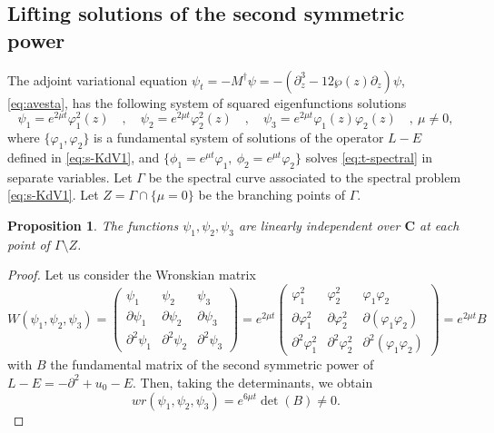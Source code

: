 \documentclass[a4paper,12pt]{article}
\newcommand{\coC}{\mathbf{C}}
\newtheorem{prop}[thm]{Proposition}
\begin{document}
\subsection{Lifting solutions of the second symmetric power}\label{sec-lifting}

The adjoint variational equation  $ \psi_t = - M^\dag  \psi  =-(\partial_z^3  -12\wp(z)\partial_z ) \psi$, \eqref{eq:avesta}, has the following system of squared eigenfunctions solutions
\begin{equation}
    \psi_1= e^{2\mu t}\varphi_1^2 (z)   \quad ,  \quad           \psi_2= e^{2\mu t}\varphi_2^2 (z)   \quad ,  \quad    
     \psi_3= e^{2\mu t}\varphi_1 (z)  \varphi_2 (z) \quad ,  \ \mu\not=0,
\end{equation}
where $\{ \varphi_1 , \varphi_2  \}$ is a fundamental system of solutions of the operator $L-E$ defined in \eqref{eq:s-KdV1}, and $\{ \phi_1 = e^{\mu t}\varphi_1 , \ \phi_2 = e^{\mu t}\varphi_2 \}$ solves \eqref{eq:t-spectral} in separate variables. Let $\Gamma$ be the spectral curve associated to the spectral problem \eqref{eq:s-KdV1}. Let $Z=\Gamma \cap \{ \mu=0 \}$ be the branching points of $\Gamma$.

\begin{prop}
The functions $\psi_1 , \psi_2 , \psi_3$ are  linearly independent over $\coC$ at each point of $\Gamma \setminus Z$.
\end{prop}

\begin{proof}
 Let us consider the Wronskian  matrix 
    \[
   W (\psi_1 , \psi_2 , \psi_3 ) = \begin{pmatrix}
      \psi_1 & \psi_2 & \psi_3  \\
    \partial  \psi_1 & \partial\psi_2 & \partial\psi_3  \\
     \partial^2 \psi_1 &\partial^2   \psi_2 & \partial^2  \psi_3  
    \end{pmatrix} = e^{2\mu t} \begin{pmatrix}
      \varphi^2_1 & \varphi^2_2 & \varphi_1   \varphi_2\\
    \partial  \varphi^2_1 & \partial\varphi^2_2 & \partial(\varphi_1   \varphi_2) \\
     \partial^2 \varphi^2_1 &\partial^2   \varphi^2_2 & \partial^2  (\varphi_1   \varphi_2)  
    \end{pmatrix} = e^{2\mu t} B
    \]
with $B$ the fundamental matrix of the second symmetric power of $L-E = -\partial^2 +u_0 -E$.  Then, taking the determinants, we obtain
\[
wr (\psi_1 , \psi_2 , \psi_3 ) =e^{6\mu t} \det (B) \not= 0 .
\]
\end{proof}
\end{document}
